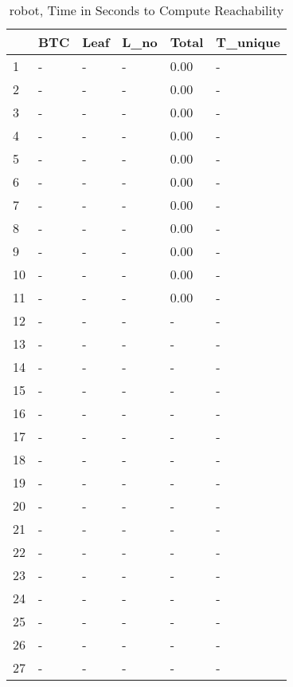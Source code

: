 \begin{table}
\centering
\caption{robot, Time in Seconds to Compute Reachability}
\label{robot_states_time}
\begin{tabular}{llllll}
\toprule
{} & BTC & Leaf & L\_no & Total & T\_unique \\
\midrule
1  &   - &    - &    - &  0.00 &        - \\
2  &   - &    - &    - &  0.00 &        - \\
3  &   - &    - &    - &  0.00 &        - \\
4  &   - &    - &    - &  0.00 &        - \\
5  &   - &    - &    - &  0.00 &        - \\
6  &   - &    - &    - &  0.00 &        - \\
7  &   - &    - &    - &  0.00 &        - \\
8  &   - &    - &    - &  0.00 &        - \\
9  &   - &    - &    - &  0.00 &        - \\
10 &   - &    - &    - &  0.00 &        - \\
11 &   - &    - &    - &  0.00 &        - \\
12 &   - &    - &    - &     - &        - \\
13 &   - &    - &    - &     - &        - \\
14 &   - &    - &    - &     - &        - \\
15 &   - &    - &    - &     - &        - \\
16 &   - &    - &    - &     - &        - \\
17 &   - &    - &    - &     - &        - \\
18 &   - &    - &    - &     - &        - \\
19 &   - &    - &    - &     - &        - \\
20 &   - &    - &    - &     - &        - \\
21 &   - &    - &    - &     - &        - \\
22 &   - &    - &    - &     - &        - \\
23 &   - &    - &    - &     - &        - \\
24 &   - &    - &    - &     - &        - \\
25 &   - &    - &    - &     - &        - \\
26 &   - &    - &    - &     - &        - \\
27 &   - &    - &    - &     - &        - \\

\end{tabular}
\end{table}

